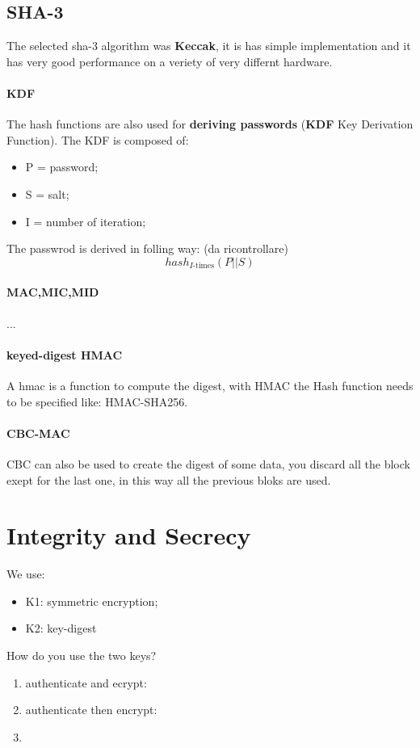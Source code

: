 \documentclass[12pt]{article}
\begin{document}
\subsection{SHA-3}
The selected sha-3 algorithm was \textbf{Keccak}, it is has simple implementation and it has very good performance on a veriety of very differnt hardware.

\paragraph{KDF}
The hash functions are also used for \textbf{deriving passwords} (\textbf{KDF} Key Derivation Function). The KDF  is composed of:
\begin{itemize}
    \item P = password;
    \item S = salt;
    \item I = number of iteration;
\end{itemize}
The passwrod is derived in folling way: (da ricontrollare)
\[ hash_{I\text{-times}} ( P || S ) \]


\paragraph{MAC,MIC,MID}
...


\paragraph{keyed-digest HMAC}
A hmac is a function to compute the digest, with HMAC the Hash function needs to be specified like: HMAC-SHA256.

\paragraph{CBC-MAC}
CBC can also be used to create the digest of some data, you discard all the block exept for the last one, in this way all the previous bloks are used.


\section{Integrity and Secrecy}
We use:
\begin{itemize}
    \item K1: symmetric encryption;
    \item K2: key-digest
\end{itemize}

How do you use the two keys?
\begin{enumerate}
    \item authenticate and ecrypt:
    \item authenticate then encrypt:
    \item
\end{enumerate}
\end{document}
